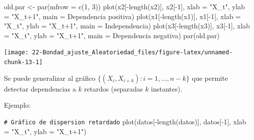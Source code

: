 \documentclass[
]{book}
\newenvironment{Shaded}{\begin{snugshade}}{\end{snugshade}}
\newcommand{\AttributeTok}[1]{\textcolor[rgb]{0.77,0.63,0.00}{#1}}
\newcommand{\CommentTok}[1]{\textcolor[rgb]{0.56,0.35,0.01}{\textit{#1}}}
\newcommand{\DecValTok}[1]{\textcolor[rgb]{0.00,0.00,0.81}{#1}}
\newcommand{\FunctionTok}[1]{\textcolor[rgb]{0.00,0.00,0.00}{#1}}
\newcommand{\NormalTok}[1]{#1}
\newcommand{\OtherTok}[1]{\textcolor[rgb]{0.56,0.35,0.01}{#1}}
\newcommand{\SpecialCharTok}[1]{\textcolor[rgb]{0.00,0.00,0.00}{#1}}
\newcommand{\StringTok}[1]{\textcolor[rgb]{0.31,0.60,0.02}{#1}}
\theoremstyle{break}
\theoremstyle{nonumberplain}
\renewcommand{\CommentTok}[1]{\textcolor[rgb]{0.41,0.41,0.41}{\texttt{#1}}}
\begin{document}
\begin{Shaded}
\begin{Highlighting}[]
\NormalTok{old.par }\OtherTok{\textless{}{-}} \FunctionTok{par}\NormalTok{(}\AttributeTok{mfrow =} \FunctionTok{c}\NormalTok{(}\DecValTok{1}\NormalTok{, }\DecValTok{3}\NormalTok{))}
\FunctionTok{plot}\NormalTok{(x2[}\SpecialCharTok{{-}}\FunctionTok{length}\NormalTok{(x2)], x2[}\SpecialCharTok{{-}}\DecValTok{1}\NormalTok{], }\AttributeTok{xlab =} \StringTok{"X\_t"}\NormalTok{, }\AttributeTok{ylab =} \StringTok{"X\_t+1"}\NormalTok{, }
     \AttributeTok{main =} \StringTok{\textquotesingle{}Dependencia positiva\textquotesingle{}}\NormalTok{)}
\FunctionTok{plot}\NormalTok{(x1[}\SpecialCharTok{{-}}\FunctionTok{length}\NormalTok{(x1)], x1[}\SpecialCharTok{{-}}\DecValTok{1}\NormalTok{], }\AttributeTok{xlab =} \StringTok{"X\_t"}\NormalTok{, }\AttributeTok{ylab =} \StringTok{"X\_t+1"}\NormalTok{, }
     \AttributeTok{main =} \StringTok{\textquotesingle{}Independencia\textquotesingle{}}\NormalTok{)}
\FunctionTok{plot}\NormalTok{(x3[}\SpecialCharTok{{-}}\FunctionTok{length}\NormalTok{(x3)], x3[}\SpecialCharTok{{-}}\DecValTok{1}\NormalTok{], }\AttributeTok{xlab =} \StringTok{"X\_t"}\NormalTok{, }\AttributeTok{ylab =} \StringTok{"X\_t+1"}\NormalTok{, }
     \AttributeTok{main =} \StringTok{\textquotesingle{}Dependencia negativa\textquotesingle{}}\NormalTok{)}
\FunctionTok{par}\NormalTok{(old.par)}
\end{Highlighting}
\end{Shaded}

\begin{center}\texttt{[image: 22-Bondad\_ajuste\_Aleatoriedad\_files/figure-latex/unnamed-chunk-13-1]} \end{center}

Se puede generalizar al gráfico \(\{(X_{i},X_{i+k}) : i = 1, \ldots, n-k \}\)
que permite detectar dependencias a \(k\) retardos
(separadas \(k\) instantes).

Ejemplo:

\begin{Shaded}
\begin{Highlighting}[]
\CommentTok{\# Gráfico de dispersion retardado}
\FunctionTok{plot}\NormalTok{(datos[}\SpecialCharTok{{-}}\FunctionTok{length}\NormalTok{(datos)], datos[}\SpecialCharTok{{-}}\DecValTok{1}\NormalTok{], }\AttributeTok{xlab =} \StringTok{"X\_t"}\NormalTok{, }\AttributeTok{ylab =} \StringTok{"X\_t+1"}\NormalTok{)}
\end{Highlighting}
\end{Shaded}
\end{document}
